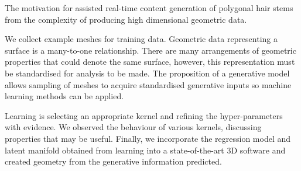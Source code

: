 \documentclass[ %
author={Dillon Keith Diep},
supervisor={Dr. Carl Henrik Ek},
degree={MEng},
title={ART-CG Hair:},
subtitle={Assisted Real-time Content Generation of Stylised Virtual Hair},
type={Research},
year={2017} ]{dissertation}
\begin{document}
The motivation for assisted real-time content generation of polygonal hair stems from the complexity of producing high dimensional geometric data.

We collect example meshes for training data. Geometric data representing a surface is a many-to-one relationship. There are many arrangements of geometric properties that could denote the same surface, however, this representation must be standardised for analysis to be made. The proposition of a generative model allows sampling of meshes to acquire standardised generative inputs so machine learning methods can be applied.

Learning is selecting an appropriate kernel and refining the hyper-parameters with evidence. We observed the behaviour of various kernels, discussing properties that may be useful. Finally, we incorporate the regression model and latent manifold obtained from learning into a state-of-the-art 3D software and created geometry from the generative information predicted.
\end{document}
